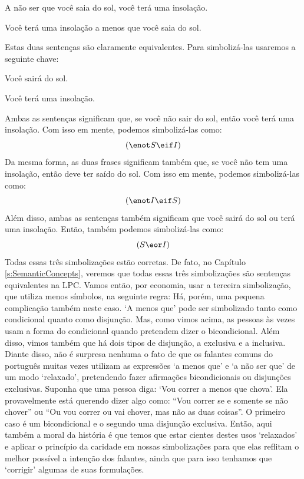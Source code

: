 \begin{earg}
\item[\ex{unless1}] A não ser que você saia do sol, você terá uma insolação.
\item[\ex{unless2}] Você terá uma insolação a menos que você saia do sol.
\end{earg}
Estas duas sentenças são claramente equivalentes.
Para simbolizá-las usaremos a seguinte chave:
	\begin{ekey}
		\item[S] Você sairá do sol.
		\item[I] Você terá uma insolação.
	\end{ekey}
Ambas as sentenças significam que, se você não sair do sol, então você terá uma insolação.
Com isso em mente, podemos simbolizá-las como:
$$(\enot S \eif I)$$
Da mesma forma, as duas frases significam também que, se você não tem uma insolação, então deve ter saído do sol.
Com isso em mente, podemos simbolizá-las como:
$$(\enot I \eif S)$$
Além disso, ambas as sentenças também significam que você sairá do sol ou terá uma insolação. Então, também podemos simbolizá-las como:
$$(S \eor I)$$
Todas essas três simbolizações estão corretas.
De fato, no Capítulo \ref{s:SemanticConcepts}, veremos que todas essas três simbolizações são sentenças equivalentes na LPC.
Vamos então, por economia, usar a terceira simbolização, que utiliza menos símbolos, na seguinte regra:
Há, porém, uma pequena complicação também neste caso.
`A menos que' pode ser simbolizado tanto como condicional quanto como disjunção.
Mas, como vimos acima, as pessoas às vezes usam a forma do condicional quando pretendem dizer o bicondicional.
Além disso, vimos também que há dois tipos de disjunção, a exclusiva e a inclusiva.
Diante disso, não é surpresa nenhuma o fato de que os falantes comuns do português muitas vezes utilizam as expressões `a menos que' e `a não ser que' de um modo `relaxado', pretendendo fazer afirmações bicondicionais ou disjunções exclusivas.
Suponha que uma pessoa diga:
`Vou correr a menos que chova'.
Ela provavelmente está querendo dizer algo como:
``Vou correr se e somente se não chover'' ou ``Ou vou correr ou vai chover, mas não as duas coisas''.
O primeiro caso é um bicondicional e o segundo uma disjunção exclusiva.
Então, aqui também a moral da história é que temos que estar cientes destes usos `relaxados' e aplicar o princípio da caridade em nossas simbolizações para que elas reflitam o melhor possível a intenção dos falantes, ainda que para isso tenhamos que `corrigir' algumas de suas formulações.



